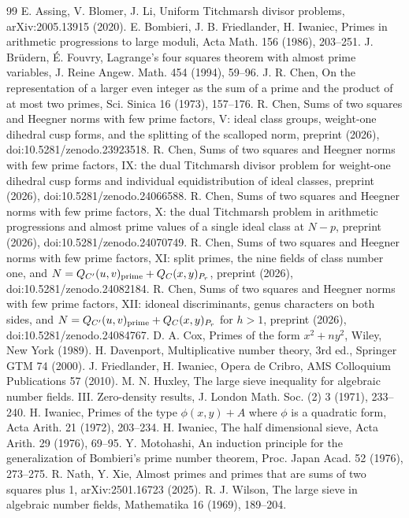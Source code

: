\documentclass[11pt]{amsart}
\theoremstyle{remark}
\begin{document}
\begin{thebibliography}{99}
 E. Assing, V. Blomer, J. Li, Uniform Titchmarsh divisor problems, arXiv:2005.13915 (2020).
 E. Bombieri, J. B. Friedlander, H. Iwaniec, Primes in arithmetic progressions to large moduli, Acta Math. 156 (1986), 203--251.
 J. Br\"udern, \'E. Fouvry, Lagrange's four squares theorem with almost prime variables, J. Reine Angew. Math. 454 (1994), 59--96.
 J. R. Chen, On the representation of a larger even integer as the sum of a prime and the product of at most two primes, Sci. Sinica 16 (1973), 157--176.
 R. Chen, Sums of two squares and Heegner norms with few prime factors, V: ideal class groups, weight-one dihedral cusp forms, and the splitting of the scalloped norm, preprint (2026), doi:10.5281/zenodo.23923518.
 R. Chen, Sums of two squares and Heegner norms with few prime factors, IX: the dual Titchmarsh divisor problem for weight-one dihedral cusp forms and individual equidistribution of ideal classes, preprint (2026), doi:10.5281/zenodo.24066588.
 R. Chen, Sums of two squares and Heegner norms with few prime factors, X: the dual Titchmarsh problem in arithmetic progressions and almost prime values of a single ideal class at $N-p$, preprint (2026), doi:10.5281/zenodo.24070749.
 R. Chen, Sums of two squares and Heegner norms with few prime factors, XI: split primes, the nine fields of class number one, and $N=Q_{C'}(u,v)_{\rm prime}+Q_C(x,y)_{P_r}$, preprint (2026), doi:10.5281/zenodo.24082184.
 R. Chen, Sums of two squares and Heegner norms with few prime factors, XII: idoneal discriminants, genus characters on both sides, and $N=Q_{C'}(u,v)_{\rm prime}+Q_C(x,y)_{P_r}$ for $h>1$, preprint (2026), doi:10.5281/zenodo.24084767.
 D. A. Cox, Primes of the form $x^2+ny^2$, Wiley, New York (1989).
 H. Davenport, Multiplicative number theory, 3rd ed., Springer GTM 74 (2000).
 J. Friedlander, H. Iwaniec, Opera de Cribro, AMS Colloquium Publications 57 (2010).
 M. N. Huxley, The large sieve inequality for algebraic number fields. III. Zero-density results, J. London Math. Soc. (2) 3 (1971), 233--240.
 H. Iwaniec, Primes of the type $\phi(x,y)+A$ where $\phi$ is a quadratic form, Acta Arith. 21 (1972), 203--234.
 H. Iwaniec, The half dimensional sieve, Acta Arith. 29 (1976), 69--95.
 Y. Motohashi, An induction principle for the generalization of Bombieri's prime number theorem, Proc. Japan Acad. 52 (1976), 273--275.
 R. Nath, Y. Xie, Almost primes and primes that are sums of two squares plus 1, arXiv:2501.16723 (2025).
 R. J. Wilson, The large sieve in algebraic number fields, Mathematika 16 (1969), 189--204.
\end{thebibliography}
\end{document}
